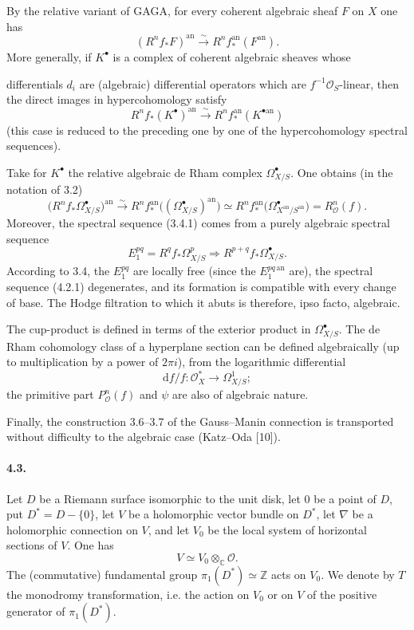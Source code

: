 \documentclass[10pt]{article}
\newcommand{\C}{\mathbb C}
\newcommand{\Z}{\mathbb Z}
\newcommand{\cO}{\mathcal O}
\theoremstyle{deligne}
\newcommand{\dd}{\mathrm d}
\begin{document}
By the relative variant of GAGA, for every coherent algebraic sheaf $F$ on $X$ one has
\[
(R^nf_*F)^{\mathrm{an}}\xrightarrow{\sim}R^nf_*^{\mathrm{an}}(F^{\mathrm{an}}).
\]
More generally, if $K^\bullet$ is a complex of coherent algebraic sheaves whose


differentials $d_i$ are (algebraic) differential operators which are $f^{-1}\cO_S$-linear, then the direct images in hypercohomology satisfy
\[
  R^n f_*(K^\bullet)^{\mathrm{an}}
  \xrightarrow{\sim}
  R^n f_*^{\mathrm{an}}(K^{\bullet\mathrm{an}})
\]
(this case is reduced to the preceding one by one of the hypercohomology spectral sequences).

Take for $K^\bullet$ the relative algebraic de Rham complex $\Omega^\bullet_{X/S}$. One obtains (in the notation of 3.2)
\[
\bigl(R^n f_*\Omega^\bullet_{X/S}\bigr)^{\mathrm{an}}
 \xrightarrow{\sim}
 R^n f_*^{\mathrm{an}}\bigl((\Omega^\bullet_{X/S})^{\mathrm{an}}\bigr)
 \simeq
 R^n f_*^{\mathrm{an}}\bigl(\Omega^\bullet_{X^{\mathrm{an}}/S^{\mathrm{an}}}\bigr)
 =
 R^n_{\cO}(f).
\]
Moreover, the spectral sequence (3.4.1) comes from a purely algebraic spectral sequence
\[
\tag{4.2.1}
E_1^{pq}=R^q f_*\Omega^p_{X/S}
\Longrightarrow
R^{p+q}f_*\Omega^\bullet_{X/S}.
\]
According to 3.4, the $E_1^{pq}$ are locally free (since the $E_1^{pq\,\mathrm{an}}$ are), the spectral sequence (4.2.1) degenerates, and its formation is compatible with every change of base. The Hodge filtration to which it abuts is therefore, ipso facto, algebraic.

The cup-product is defined in terms of the exterior product in $\Omega^\bullet_{X/S}$. The de Rham cohomology class of a hyperplane section can be defined algebraically (up to multiplication by a power of $2\pi i$), from the logarithmic differential
\[
  \dd f/f:\cO_X^*\longrightarrow \Omega^1_{X/S};
\]
the primitive part $P^n_{\cO}(f)$ and $\psi$ are also of algebraic nature.

Finally, the construction 3.6--3.7 of the Gauss--Manin connection is transported without difficulty to the algebraic case (Katz--Oda [10]).

\paragraph{4.3.}
Let $D$ be a Riemann surface isomorphic to the unit disk, let $0$ be a point of $D$, put $D^*=D-\{0\}$, let $V$ be a holomorphic vector bundle on $D^*$, let $\nabla$ be a holomorphic connection on $V$, and let $V_0$ be the local system of horizontal sections of $V$. One has
\[
  V \simeq V_0\otimes_\C \cO .
\]
The (commutative) fundamental group $\pi_1(D^*)\simeq \Z$ acts on $V_0$. We denote by $T$ the monodromy transformation, i.e. the action on $V_0$ or on $V$ of the positive generator of $\pi_1(D^*)$.
\end{document}
